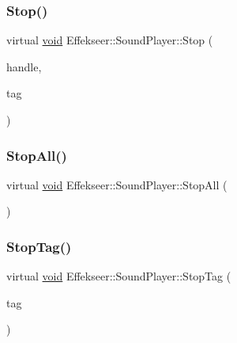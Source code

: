 \mbox{\label{class_effekseer_1_1_sound_player_af300227673261666ce202159054db9bb}} 
\subsubsection{\texorpdfstring{Stop()}{Stop()}}
{\footnotesize\ttfamily virtual \mbox{\hyperlink{namespace_effekseer_ab34c4088e512200cf4c2716f168deb56}{void}} Effekseer\+::\+Sound\+Player\+::\+Stop (\begin{DoxyParamCaption}\item[{\mbox{\hyperlink{namespace_effekseer_a694a300b9b688ca40f6a0d9841d437bf}{Sound\+Handle}}}]{handle,  }\item[{\mbox{\hyperlink{namespace_effekseer_adb219197297396cf2ab9bee657551a29}{Sound\+Tag}}}]{tag }\end{DoxyParamCaption})\hspace{0.3cm}{\ttfamily [pure virtual]}}

\mbox{\label{class_effekseer_1_1_sound_player_a058465ab0f8c94607651a743767f64d2}} 
\subsubsection{\texorpdfstring{Stop\+All()}{StopAll()}}
{\footnotesize\ttfamily virtual \mbox{\hyperlink{namespace_effekseer_ab34c4088e512200cf4c2716f168deb56}{void}} Effekseer\+::\+Sound\+Player\+::\+Stop\+All (\begin{DoxyParamCaption}{ }\end{DoxyParamCaption})\hspace{0.3cm}{\ttfamily [pure virtual]}}

\mbox{\label{class_effekseer_1_1_sound_player_a4726bc7f3f4049508a268f16a4beeb56}} 
\subsubsection{\texorpdfstring{Stop\+Tag()}{StopTag()}}
{\footnotesize\ttfamily virtual \mbox{\hyperlink{namespace_effekseer_ab34c4088e512200cf4c2716f168deb56}{void}} Effekseer\+::\+Sound\+Player\+::\+Stop\+Tag (\begin{DoxyParamCaption}\item[{\mbox{\hyperlink{namespace_effekseer_adb219197297396cf2ab9bee657551a29}{Sound\+Tag}}}]{tag }\end{DoxyParamCaption})\hspace{0.3cm}{\ttfamily [pure virtual]}}



